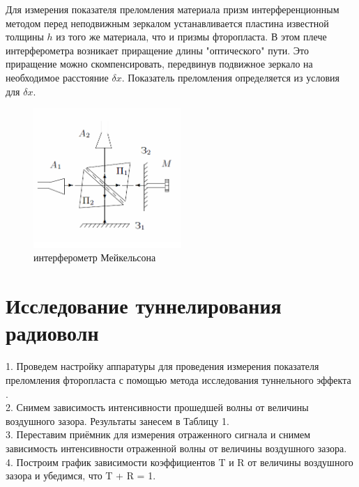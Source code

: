 \documentclass[12pt]{article}
\begin{document}
Для измерения показателя преломления материала призм интерференционным методом перед неподвижным зеркалом устанавливается пластина известной толщины $h$ из того же материала, что и призмы фторопласта. В этом плече интерферометра возникает приращение длины "оптического" пути. Это приращение можно скомпенсировать, передвинув подвижное зеркало на необходимое расстояние $\delta x$. Показатель преломления определяется из условия для $\delta x$.
\begin{figure}[!h]
\begin{center}
\includegraphics[width=0.5\textwidth]{interferometrteor}
\caption{интерферометр Мейкельсона}
\end{center}
\end{figure}
\section{Исследование туннелирования радиоволн}
1. Проведем настройку аппаратуры для проведения измерения показателя преломления фторопласта с помощью метода исследования туннельного эффекта .\\
2. Снимем зависимость интенсивности прошедшей волны от величины воздушного зазора. Результаты занесем в Таблицу 1.\\
3. Переставим приёмник для измерения отраженного сигнала и снимем зависимость интенсивности отраженной волны от величины воздушного зазора.\\
4. Построим график зависимости коэффициентов T и R от величины воздушного зазора и убедимся, что T + R = 1.\\
\end{document}
